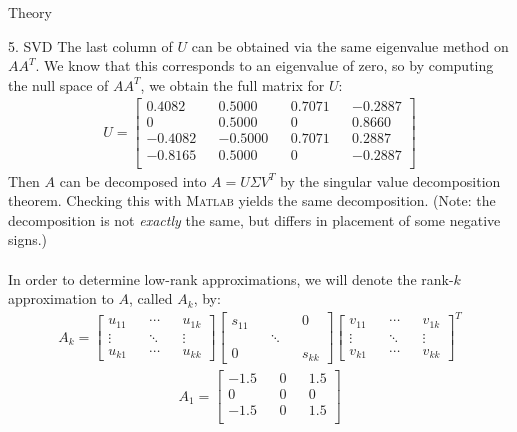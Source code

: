 \begin{section}{Theory}
\begin{homeworkSection}{5. SVD}
{    The last column of $U$ can be obtained via the same eigenvalue method on $AA^T$. We know that this corresponds to an eigenvalue of zero, so by computing the null space of $AA^T$, we obtain the full matrix for $U$:
    \begin{align*}
        U = \begin{bmatrix} 
                0.4082 &&   0.5000  &&  0.7071  && -0.2887 \\
                     0 &&   0.5000  &&       0  &&  0.8660 \\
               -0.4082 &&  -0.5000  &&  0.7071  &&  0.2887 \\
               -0.8165 &&   0.5000  &&       0  &&  -0.2887 \\
            \end{bmatrix}
    \end{align*}
    Then $A$ can be decomposed into $A = U \Sigma V^T$ by the singular value decomposition theorem. Checking this with \textsc{Matlab} yields the same decomposition. (Note: the decomposition is not \textit{exactly} the same, but differs in placement of some negative signs.)
    \\
    \\
    In order to determine low-rank approximations, we will denote the rank-$k$ approximation to $A$, called $A_k$, by:
    \begin{align*}
        A_k = \begin{bmatrix} u_{11} && \cdots && u_{1k} \\ \vdots && \ddots && \vdots \\ u_{k1} && \cdots && u_{kk} \end{bmatrix}
        \begin{bmatrix} s_{11} &&  && 0 \\  && \ddots &&  \\ 0 &&  && s_{kk} \end{bmatrix}
        \begin{bmatrix} v_{11} && \cdots && v_{1k} \\ \vdots && \ddots && \vdots \\ v_{k1} && \cdots && v_{kk} \end{bmatrix}^T
    \end{align*}
    \begin{align*}
        A_1 = \begin{bmatrix} -1.5 && 0 && 1.5\\ 
        0 && 0 && 0\\ 
        -1.5 && 0 && 1.5\\ 

\end{bmatrix}
\end{align*}}
\end{homeworkSection}
\end{section}
